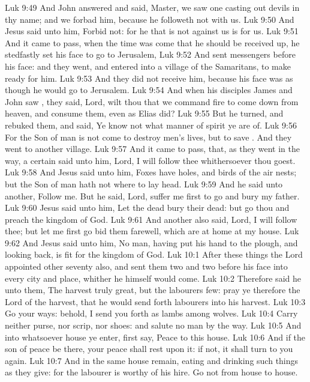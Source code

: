 \vs Luk 9:49 And John answered and said, Master, we saw one casting out devils in thy name; and we forbad him, because he followeth not with us.
\vs Luk 9:50 And Jesus said unto him, Forbid  not: for he that is not against us is for us.
\vs Luk 9:51 And it came to pass, when the time was come that he should be received up, he stedfastly set his face to go to Jerusalem,
\vs Luk 9:52 And sent messengers before his face: and they went, and entered into a village of the Samaritans, to make ready for him.
\vs Luk 9:53 And they did not receive him, because his face was as though he would go to Jerusalem.
\vs Luk 9:54 And when his disciples James and John saw , they said, Lord, wilt thou that we command fire to come down from heaven, and consume them, even as Elias did?
\vs Luk 9:55 But he turned, and rebuked them, and said, Ye know not what manner of spirit ye are of.
\vs Luk 9:56 For the Son of man is not come to destroy men's lives, but to save . And they went to another village.
\vs Luk 9:57 And it came to pass, that, as they went in the way, a certain  said unto him, Lord, I will follow thee whithersoever thou goest.
\vs Luk 9:58 And Jesus said unto him, Foxes have holes, and birds of the air  nests; but the Son of man hath not where to lay  head.
\vs Luk 9:59 And he said unto another, Follow me. But he said, Lord, suffer me first to go and bury my father.
\vs Luk 9:60 Jesus said unto him, Let the dead bury their dead: but go thou and preach the kingdom of God.
\vs Luk 9:61 And another also said, Lord, I will follow thee; but let me first go bid them farewell, which are at home at my house.
\vs Luk 9:62 And Jesus said unto him, No man, having put his hand to the plough, and looking back, is fit for the kingdom of God.
\vs Luk 10:1 After these things the Lord appointed other seventy also, and sent them two and two before his face into every city and place, whither he himself would come.
\vs Luk 10:2 Therefore said he unto them, The harvest truly  great, but the labourers  few: pray ye therefore the Lord of the harvest, that he would send forth labourers into his harvest.
\vs Luk 10:3 Go your ways: behold, I send you forth as lambs among wolves.
\vs Luk 10:4 Carry neither purse, nor scrip, nor shoes: and salute no man by the way.
\vs Luk 10:5 And into whatsoever house ye enter, first say, Peace  to this house.
\vs Luk 10:6 And if the son of peace be there, your peace shall rest upon it: if not, it shall turn to you again.
\vs Luk 10:7 And in the same house remain, eating and drinking such things as they give: for the labourer is worthy of his hire. Go not from house to house.

